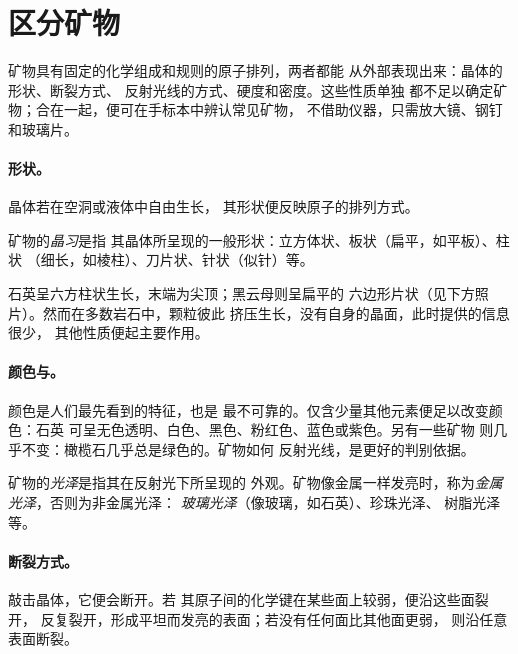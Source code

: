 \section{区分矿物}

矿物具有固定的化学组成和规则的原子排列，两者都能
从外部表现出来：晶体的形状、断裂方式、
反射光线的方式、硬度和密度。这些性质单独
都不足以确定矿物；合在一起，便可在手标本中辨认常见矿物，
不借助仪器，只需放大镜、钢钉和玻璃片。

\paragraph{形状。}晶体若在空洞或液体中自由生长，
其形状便反映原子的排列方式。

\begin{definition}[晶习]\label{def:g11:minerals:habit}
矿物的\emph{晶习}是指
其晶体所呈现的一般形状：立方体状、板状（扁平，如平板）、柱状
（细长，如棱柱）、刀片状、针状（似针）等。
\end{definition}

石英呈六方柱状生长，末端为尖顶；黑云母则呈扁平的
六边形片状（见下方照片）。然而在多数岩石中，颗粒彼此
挤压生长，没有自身的晶面，此时提供的信息很少，
其他性质便起主要作用。

\paragraph{颜色与。}颜色是人们最先看到的特征，也是
最不可靠的。仅含少量其他元素便足以改变颜色：石英
可呈无色透明、白色、黑色、粉红色、蓝色或紫色。另有一些矿物
则几乎不变：橄榄石几乎总是绿色的。矿物如何
反射光线，是更好的判别依据。

\begin{definition}[光泽]\label{def:g11:minerals:lustre}
矿物的\emph{光泽}是指其在反射光下所呈现的
外观。矿物像金属一样发亮时，称为\emph{金属光泽}，否则为非金属光泽：
\emph{玻璃光泽}（像玻璃，如石英）、珍珠光泽、
树脂光泽等。
\end{definition}

\paragraph{断裂方式。}敲击晶体，它便会断开。若
其原子间的化学键在某些面上较弱，便沿这些面裂开，
反复裂开，形成平坦而发亮的表面；若没有任何面比其他面更弱，
则沿任意表面断裂。

